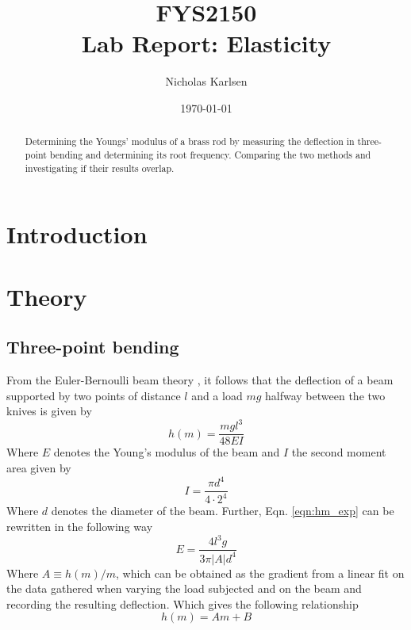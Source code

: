 \documentclass[11pt,a4paper]{article}
\begin{document}

\title{FYS2150 \\ Lab Report: Elasticity}%

\author{Nicholas Karlsen}

\date{\today}%

\maketitle

\begin{abstract}
Determining the Youngs' modulus of a brass rod by measuring the deflection in three-point bending and determining its root frequency. Comparing the two methods and investigating if their results overlap.
\end{abstract}


\section{\label{sect:intro}Introduction}
    
\section{\label{sect:theory}Theory}
  \subsection{Three-point bending}
  From the Euler-Bernoulli beam theory \cite{3pt}, it follows that the deflection of a beam supported by two points of distance $l$ and a load $mg$ halfway between the two knives is given by
  \begin{equation}
    h(m) = \frac{mgl^3}{48EI}
    \label{eqn:hm_exp}
  \end{equation}
  Where $E$ denotes the Young's modulus \cite{ymodul} of the beam and $I$ the second moment area given by 
  \begin{equation}
    I = \frac{\pi d^4}{4\cdot 2^4}
  \end{equation}
  Where $d$ denotes the diameter of the beam.
  \newline
  Further, Eqn. \ref{eqn:hm_exp} can be rewritten in the following way
  \begin{equation}
    E = \frac{4l^3g}{3\pi |A|d^4}
    \label{eqn:E_deflection}
  \end{equation}
  Where $A \equiv h(m)/m$, which can be obtained as the gradient from a linear fit on the data gathered when varying the load subjected and on the beam and recording the resulting deflection. Which gives the following relationship
  \begin{equation}
    h(m) = Am + B
  \end{equation}
  
\end{document}
